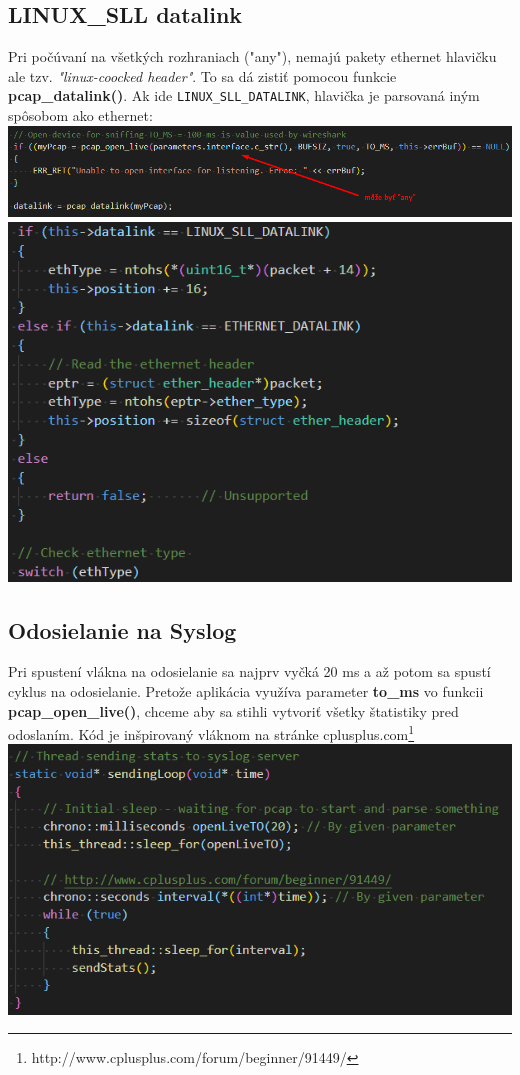 \documentclass{article}
\begin{document}
        \subsection{LINUX_SLL datalink}
        Pri počúvaní na všetkých rozhraniach ("any"), nemajú pakety ethernet hlavičku ale tzv. \emph{"linux-coocked header"}.
        To sa dá zistiť pomocou funkcie \textbf{pcap_datalink()}. Ak ide \texttt{LINUX_SLL_DATALINK}, hlavička je parsovaná iným spôsobom ako ethernet:
        \includegraphics {datalink.png}
        \includegraphics {ethernet.png}

        \subsection{Odosielanie na Syslog}
        Pri spustení vlákna na odosielanie sa najprv vyčká 20 ms a až potom sa spustí cyklus na odosielanie. Pretože aplikácia využíva parameter \textbf{to_ms}
        vo funkcii \textbf{pcap_open_live()}, chceme aby sa stihli vytvoriť všetky štatistiky pred odoslaním. Kód je inšpirovaný vláknom na stránke
        cplusplus.com\footnote{http://www.cplusplus.com/forum/beginner/91449/}
        \includegraphics {loop.png}
\end{document}
